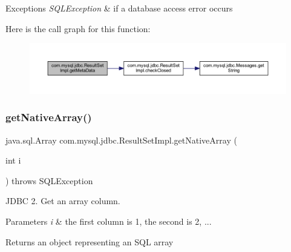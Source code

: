 \begin{DoxyExceptions}{Exceptions}
{\em S\+Q\+L\+Exception} & if a database access error occurs \\
\hline
\end{DoxyExceptions}
Here is the call graph for this function\+:
\nopagebreak
\begin{figure}[H]
\begin{center}
\leavevmode
\includegraphics[width=350pt]{classcom_1_1mysql_1_1jdbc_1_1_result_set_impl_adf8449b6f578c8e424326ec7a25a6b97_cgraph}
\end{center}
\end{figure}
\mbox{\label{classcom_1_1mysql_1_1jdbc_1_1_result_set_impl_a76b1a9c9433c919ed45a65c8ace0705f}} 
\subsubsection{\texorpdfstring{get\+Native\+Array()}{getNativeArray()}}
{\footnotesize\ttfamily java.\+sql.\+Array com.\+mysql.\+jdbc.\+Result\+Set\+Impl.\+get\+Native\+Array (\begin{DoxyParamCaption}\item[{int}]{i }\end{DoxyParamCaption}) throws S\+Q\+L\+Exception\hspace{0.3cm}{\ttfamily [protected]}}

J\+D\+BC 2. Get an array column.


\begin{DoxyParams}{Parameters}
{\em i} & the first column is 1, the second is 2, ...\\
\hline
\end{DoxyParams}
\begin{DoxyReturn}{Returns}
an object representing an S\+QL array
\end{DoxyReturn}

